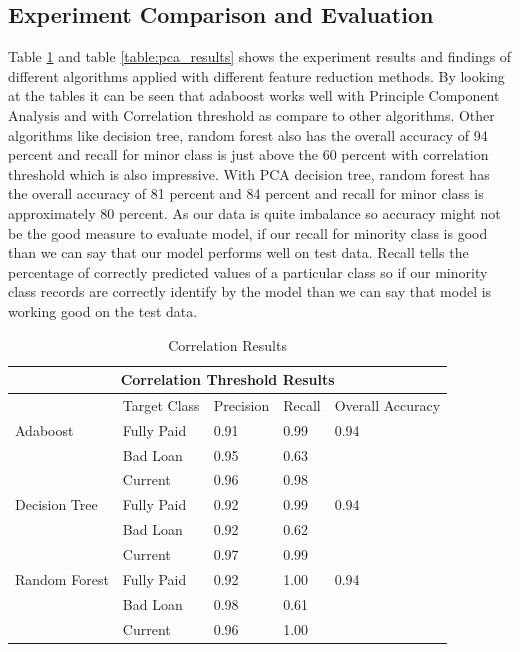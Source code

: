 \documentclass[12pt]{article}
\begin{document}
\subsection{Experiment Comparison and Evaluation}
Table \ref{table:correlation_results} and table \ref{table:pca_results} shows the experiment results and findings of different algorithms applied with different feature reduction methods. By looking at the tables it can be seen that adaboost works well with Principle Component Analysis and with Correlation threshold as compare to other algorithms. Other algorithms like decision tree, random forest also has the overall accuracy of 94 percent and recall for minor class is just above the 60 percent with correlation threshold which is also impressive. With PCA decision tree, random forest has the overall accuracy of 81 percent and 84 percent and recall for minor class is approximately 80 percent. As our data is quite imbalance so accuracy might not be the good measure to evaluate model, if our recall for minority class is good than we can say that our model performs well on test data. Recall tells the percentage of correctly predicted values of a particular class so if our minority class records are correctly identify by the model than we can say that model is working good on the test data. 
\begin{table}[h!]
	\centering
	\begin{tabular}{ |p{3cm}||p{2cm}|p{2cm}|p{2cm}|p{2cm}|  }
		\hline
		\multicolumn{5}{|c|}{Correlation Threshold Results} \\
		\hline
		& Target Class & Precision & Recall & Overall Accuracy \\
		\hline
		Adaboost & Fully Paid & 0.91 & 0.99 & 0.94\\
					  & Bad Loan & 0.95   & 0.63 & \\
					  & Current &0.96 & 0.98 & \\
		\hline
		Decision Tree & Fully Paid & 0.92 & 0.99 & 0.94\\
		& Bad Loan & 0.92 &  0.62 & \\
		& Current &0.97 & 0.99 & \\
		\hline
		Random Forest & Fully Paid & 0.92  & 1.00 & 0.94\\
		& Bad Loan & 0.98  &  0.61 & \\
		& Current & 0.96   &   1.00 & \\
		\hline
	\end{tabular}
	\caption{Correlation Results}
	\label{table:correlation_results}
\end{table}
\end{document}
